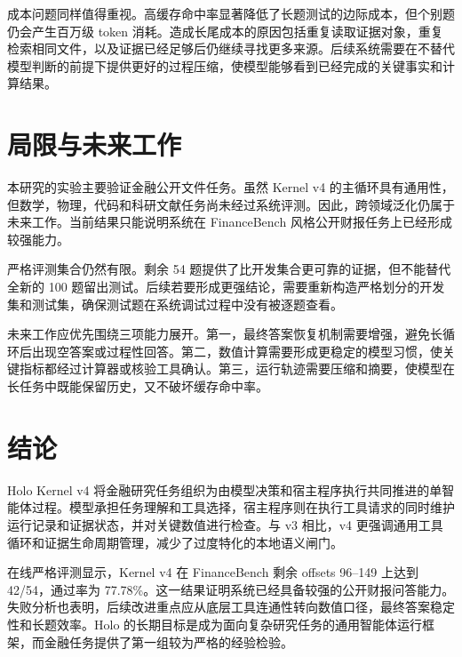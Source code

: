 \documentclass[12pt,a4paper,UTF8]{ctexart}
\begin{document}
成本问题同样值得重视。高缓存命中率显著降低了长题测试的边际成本，但个别题仍会产生百万级 token 消耗。造成长尾成本的原因包括重复读取证据对象，重复检索相同文件，以及证据已经足够后仍继续寻找更多来源。后续系统需要在不替代模型判断的前提下提供更好的过程压缩，使模型能够看到已经完成的关键事实和计算结果。

\section{局限与未来工作}

本研究的实验主要验证金融公开文件任务。虽然 Kernel v4 的主循环具有通用性，但数学，物理，代码和科研文献任务尚未经过系统评测。因此，跨领域泛化仍属于未来工作。当前结果只能说明系统在 FinanceBench 风格公开财报任务上已经形成较强能力。

严格评测集合仍然有限。剩余 54 题提供了比开发集合更可靠的证据，但不能替代全新的 100 题留出测试。后续若要形成更强结论，需要重新构造严格划分的开发集和测试集，确保测试题在系统调试过程中没有被逐题查看。

未来工作应优先围绕三项能力展开。第一，最终答案恢复机制需要增强，避免长循环后出现空答案或过程性回答。第二，数值计算需要形成更稳定的模型习惯，使关键指标都经过计算器或核验工具确认。第三，运行轨迹需要压缩和摘要，使模型在长任务中既能保留历史，又不破坏缓存命中率。

\section{结论}

Holo Kernel v4 将金融研究任务组织为由模型决策和宿主程序执行共同推进的单智能体过程。模型承担任务理解和工具选择，宿主程序则在执行工具请求的同时维护运行记录和证据状态，并对关键数值进行检查。与 v3 相比，v4 更强调通用工具循环和证据生命周期管理，减少了过度特化的本地语义闸门。

在线严格评测显示，Kernel v4 在 FinanceBench 剩余 offsets 96--149 上达到 42/54，通过率为 77.78\%。这一结果证明系统已经具备较强的公开财报问答能力。失败分析也表明，后续改进重点应从底层工具连通性转向数值口径，最终答案稳定性和长题效率。Holo 的长期目标是成为面向复杂研究任务的通用智能体运行框架，而金融任务提供了第一组较为严格的经验检验。

\end{document}
